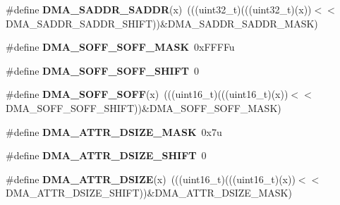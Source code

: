 \begin{DoxyCompactItemize}
\item 
\#define {\bfseries D\+M\+A\+\_\+\+S\+A\+D\+D\+R\+\_\+\+S\+A\+D\+DR}(x)~(((uint32\+\_\+t)(((uint32\+\_\+t)(x))$<$$<$D\+M\+A\+\_\+\+S\+A\+D\+D\+R\+\_\+\+S\+A\+D\+D\+R\+\_\+\+S\+H\+I\+FT))\&D\+M\+A\+\_\+\+S\+A\+D\+D\+R\+\_\+\+S\+A\+D\+D\+R\+\_\+\+M\+A\+SK)\hypertarget{group__DMA__Register__Masks_gaed2c0dfa4b40da7d754af68651980303}{}\label{group__DMA__Register__Masks_gaed2c0dfa4b40da7d754af68651980303}

\item 
\#define {\bfseries D\+M\+A\+\_\+\+S\+O\+F\+F\+\_\+\+S\+O\+F\+F\+\_\+\+M\+A\+SK}~0x\+F\+F\+F\+Fu\hypertarget{group__DMA__Register__Masks_ga2bca88a49fda82f9a61bb3d832a9c156}{}\label{group__DMA__Register__Masks_ga2bca88a49fda82f9a61bb3d832a9c156}

\item 
\#define {\bfseries D\+M\+A\+\_\+\+S\+O\+F\+F\+\_\+\+S\+O\+F\+F\+\_\+\+S\+H\+I\+FT}~0\hypertarget{group__DMA__Register__Masks_ga79f435a1aaf18a307644638b20599a9e}{}\label{group__DMA__Register__Masks_ga79f435a1aaf18a307644638b20599a9e}

\item 
\#define {\bfseries D\+M\+A\+\_\+\+S\+O\+F\+F\+\_\+\+S\+O\+FF}(x)~(((uint16\+\_\+t)(((uint16\+\_\+t)(x))$<$$<$D\+M\+A\+\_\+\+S\+O\+F\+F\+\_\+\+S\+O\+F\+F\+\_\+\+S\+H\+I\+FT))\&D\+M\+A\+\_\+\+S\+O\+F\+F\+\_\+\+S\+O\+F\+F\+\_\+\+M\+A\+SK)\hypertarget{group__DMA__Register__Masks_ga17c965464f8707b527e21600d136c450}{}\label{group__DMA__Register__Masks_ga17c965464f8707b527e21600d136c450}

\item 
\#define {\bfseries D\+M\+A\+\_\+\+A\+T\+T\+R\+\_\+\+D\+S\+I\+Z\+E\+\_\+\+M\+A\+SK}~0x7u\hypertarget{group__DMA__Register__Masks_ga2093ce5434ffef34988c7e74999edbee}{}\label{group__DMA__Register__Masks_ga2093ce5434ffef34988c7e74999edbee}

\item 
\#define {\bfseries D\+M\+A\+\_\+\+A\+T\+T\+R\+\_\+\+D\+S\+I\+Z\+E\+\_\+\+S\+H\+I\+FT}~0\hypertarget{group__DMA__Register__Masks_ga24d7778d89bba4e048649cfa85bbc2d3}{}\label{group__DMA__Register__Masks_ga24d7778d89bba4e048649cfa85bbc2d3}

\item 
\#define {\bfseries D\+M\+A\+\_\+\+A\+T\+T\+R\+\_\+\+D\+S\+I\+ZE}(x)~(((uint16\+\_\+t)(((uint16\+\_\+t)(x))$<$$<$D\+M\+A\+\_\+\+A\+T\+T\+R\+\_\+\+D\+S\+I\+Z\+E\+\_\+\+S\+H\+I\+FT))\&D\+M\+A\+\_\+\+A\+T\+T\+R\+\_\+\+D\+S\+I\+Z\+E\+\_\+\+M\+A\+SK)\hypertarget{group__DMA__Register__Masks_ga6f2bffdadee81034ea85759111dfc711}{}\label{group__DMA__Register__Masks_ga6f2bffdadee81034ea85759111dfc711}


\end{DoxyCompactItemize}
